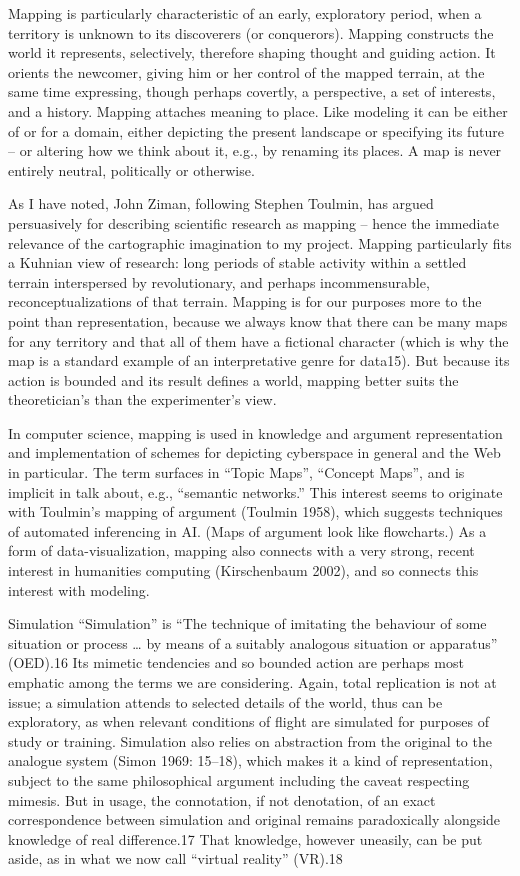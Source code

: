 Mapping is particularly characteristic of an early, exploratory period,
when a territory is unknown to its discoverers (or conquerors). Mapping
constructs the world it represents, selectively, therefore shaping
thought and guiding action. It orients the newcomer, giving him or her
control of the mapped terrain, at the same time expressing, though
perhaps covertly, a perspective, a set of interests, and a history.
Mapping attaches meaning to place. Like modeling it can be either of or
for a domain, either depicting the present landscape or specifying its
future -- or altering how we think about it, e.g., by renaming its
places. A map is never entirely neutral, politically or otherwise.

As I have noted, John Ziman, following Stephen Toulmin, has argued
persuasively for describing scientific research as mapping -- hence the
immediate relevance of the cartographic imagination to my project.
Mapping particularly fits a Kuhnian view of research: long periods of
stable activity within a settled terrain interspersed by revolutionary,
and perhaps incommensurable, reconceptualizations of that terrain.
Mapping is for our purposes more to the point than representation,
because we always know that there can be many maps for any territory and
that all of them have a fictional character (which is why the map is a
standard example of an interpretative genre for data15). But because its
action is bounded and its result defines a world, mapping better suits
the theoretician's than the experimenter's view.

In computer science, mapping is used in knowledge and argument
representation and implementation of schemes for depicting cyberspace in
general and the Web in particular. The term surfaces in ``Topic Maps'',
``Concept Maps'', and is implicit in talk about, e.g., ``semantic
networks.'' This interest seems to originate with Toulmin's mapping of
argument (Toulmin 1958), which suggests techniques of automated
inferencing in AI. (Maps of argument look like flowcharts.) As a form of
data-visualization, mapping also connects with a very strong, recent
interest in humanities computing (Kirschenbaum 2002), and so connects
this interest with modeling.

Simulation ``Simulation'' is ``The technique of imitating the behaviour
of some situation or process \ldots{} by means of a suitably analogous
situation or apparatus'' (OED).16 Its mimetic tendencies and so bounded
action are perhaps most emphatic among the terms we are considering.
Again, total replication is not at issue; a simulation attends to
selected details of the world, thus can be exploratory, as when relevant
conditions of flight are simulated for purposes of study or training.
Simulation also relies on abstraction from the original to the analogue
system (Simon 1969: 15--18), which makes it a kind of representation,
subject to the same philosophical argument including the caveat
respecting mimesis. But in usage, the connotation, if not denotation, of
an exact correspondence between simulation and original remains
paradoxically alongside knowledge of real difference.17 That knowledge,
however uneasily, can be put aside, as in what we now call ``virtual
reality'' (VR).18

